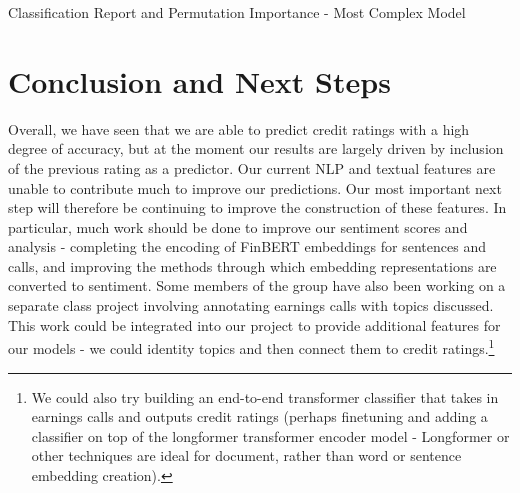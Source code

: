 \documentclass{article}[11pt]
\begin{document}
    \begin{table}[h!]
        \centering
        \caption{Classification Report and Permutation Importance - Most Complex Model}
        \begin{minipage}[c]{0.45\linewidth}
            \centering
            
        \end{minipage}
        \begin{minipage}[c]{0.45\linewidth}
            \centering
            
        \end{minipage}
        \label{tab:most-complex-classification-report-and-permutation-importance}
    \end{table}

    \section*{Conclusion and Next Steps}

    Overall, we have seen that we are able to predict credit ratings with a high degree of accuracy, but at the moment our results are largely driven by inclusion of the previous rating as a predictor. Our current NLP and textual features are unable to contribute much to improve our predictions. Our most important next step will therefore be continuing to improve the construction of these features. In particular, much work should be done to improve our sentiment scores and analysis - completing the encoding of FinBERT embeddings for sentences and calls, and improving the methods through which embedding representations are converted to sentiment. Some members of the group have also been working on a separate class project involving annotating earnings calls with topics discussed. This work could be integrated into our project to provide additional features for our models - we could identity topics and then connect them to credit ratings.\footnote{We could also try building an end-to-end transformer classifier that takes in earnings calls and outputs credit ratings (perhaps finetuning and adding a classifier on top of the longformer \citep{beltagy_longformer_2020} transformer encoder model - Longformer or other techniques are ideal for document, rather than word or sentence embedding creation).}
\end{document}
